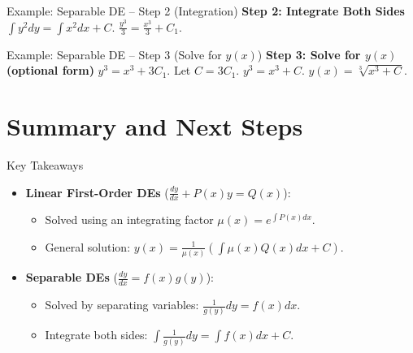 \documentclass[10pt,aspectratio=169]{beamer}
\begin{document}
\begin{frame}{Example: Separable DE -- Step 2 (Integration)}
    \textbf{Step 2: Integrate Both Sides}
    $\int y^2 dy = \int x^2 dx + C$.
    $\frac{y^3}{3} = \frac{x^3}{3} + C_1$.
\end{frame}

\begin{frame}{Example: Separable DE -- Step 3 (Solve for $y(x)$)}
    \textbf{Step 3: Solve for $y(x)$ (optional form)}
    $y^3 = x^3 + 3C_1$. Let $C = 3C_1$.
    $y^3 = x^3 + C$.
    $y(x) = \sqrt[3]{x^3 + C}$.
\end{frame}

\section{Summary and Next Steps}

\begin{frame}{Key Takeaways}
    \begin{itemize}
        \item \textbf{Linear First-Order DEs} ($\frac{dy}{dx} + P(x)y = Q(x)$):
        \begin{itemize}
            \item Solved using an integrating factor $\mu(x) = e^{\int P(x)dx}$.
            \item General solution: $y(x) = \frac{1}{\mu(x)} \left( \int \mu(x)Q(x)dx + C \right)$.
        \end{itemize}
        \item \textbf{Separable DEs} ($\frac{dy}{dx} = f(x)g(y)$):
        \begin{itemize}
            \item Solved by separating variables: $\frac{1}{g(y)}dy = f(x)dx$.
            \item Integrate both sides: $\int \frac{1}{g(y)}dy = \int f(x)dx + C$.
        \end{itemize}
    \end{itemize}
\end{frame}
\end{document}
